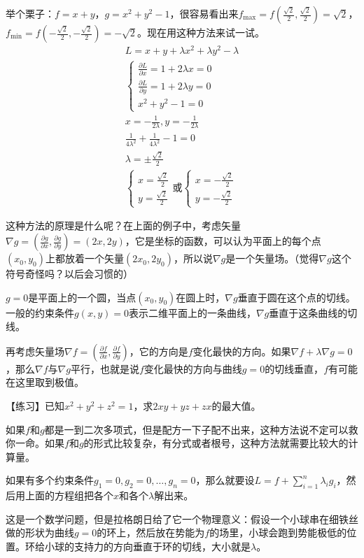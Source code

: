 举个栗子：$f=x+y$，$g=x^2+y^2-1$，很容易看出来$f_\text{max}=f(\frac{\sqrt{2}}{2},\frac{\sqrt{2}}{2})=\sqrt{2}$，$f_\text{min}=f(-\frac{\sqrt{2}}{2},-\frac{\sqrt{2}}{2})=-\sqrt{2}$。现在用这种方法来试一试。
\begin{gather*}
L=x+y+\lambda x^2+\lambda y^2-\lambda \\
\begin{cases}
\frac{\partial L}{\partial x}=1+2 \lambda x=0 \\
\frac{\partial L}{\partial y}=1+2 \lambda y=0 \\
x^2+y^2-1=0
\end{cases} \\
x=-\frac{1}{2 \lambda},y=-\frac{1}{2 \lambda} \\
\frac{1}{4 \lambda^2}+\frac{1}{4 \lambda^2}-1=0 \\
\lambda=\pm \frac{\sqrt{2}}{2} \\
\begin{cases}
x=\frac{\sqrt{2}}{2} \\
y=\frac{\sqrt{2}}{2}
\end{cases}\text{或{}}\begin{cases}
x=-\frac{\sqrt{2}}{2} \\
y=-\frac{\sqrt{2}}{2}
\end{cases}
\end{gather*}

这种方法的原理是什么呢？在上面的例子中，考虑矢量$\nabla g=(\frac{\partial g}{\partial x},\frac{\partial g}{\partial y})=(2x,2y)$，它是坐标的函数，可以认为平面上的每个点$(x_0,y_0)$上都放着一个矢量$(2x_0,2y_0)$，所以说$\nabla g$是一个矢量场。（觉得$\nabla g$这个符号奇怪吗？以后会习惯的）

$g=0$是平面上的一个圆，当点$(x_0,y_0)$在圆上时，$\nabla g$垂直于圆在这个点的切线。一般的约束条件$g(x,y)=0$表示二维平面上的一条曲线，$\nabla g$垂直于这条曲线的切线。

再考虑矢量场$\nabla f=(\frac{\partial f}{\partial x},\frac{\partial f}{\partial y})$，它的方向是$f$变化最快的方向。如果$\nabla f+\lambda \nabla g=0$，那么$\nabla f$与$\nabla g$平行，也就是说$f$变化最快的方向与曲线$g=0$的切线垂直，$f$有可能在这里取到极值。

【练习】已知$x^2+y^2+z^2=1$，求$2x y+y z+z x$的最大值。

如果$f$和$g$都是一到二次多项式，但是配方一下子配不出来，这种方法说不定可以救你一命。如果$f$和$g$的形式比较复杂，有分式或者根号，这种方法就需要比较大的计算量。

如果有多个约束条件$g_1=0,g_2=0,\dots,g_n=0$，那么就要设$L=f+\sum_{i=1}^n \lambda_i g_i$，然后用上面的方程组把各个$x$和各个$\lambda$解出来。

这是一个数学问题，但是拉格朗日给了它一个物理意义：假设一个小球串在细铁丝做的形状为曲线$g=0$的环上，然后放在势能为$f$的场里，小球会跑到势能极低的位置。环给小球的支持力的方向垂直于环的切线，大小就是$\lambda$。
